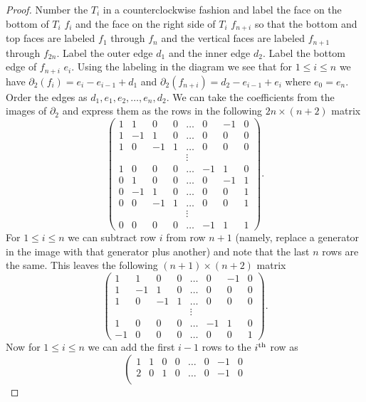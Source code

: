 \documentclass{article}
\begin{document}
\begin{proof}
Number the $T_i$ in a counterclockwise fashion and label the face on the bottom of $T_i$ $f_i$ and the face on the right side of $T_i$ $f_{n+i}$ so that the bottom and top faces are labeled $f_1$ through $f_n$ and the vertical faces are labeled $f_{n+1}$ through $f_{2n}$. Label the outer edge $d_1$ and the inner edge $d_2$. Label the bottom edge of $f_{n+i}$ $e_i$. Using the labeling in the diagram we see that for $1 \leq i \leq n$ we have $\partial_2(f_i) = e_i - e_{i-1} + d_1$ and $\partial_2(f_{n+i}) = d_2 - e_{i-1} + e_i$ where $e_0 = e_n$. Order the edges as $d_1, e_1, e_2, \dots , e_n, d_2$. We can take the coefficients from the images of $\partial_2$ and express them as the rows in the following $2n \times (n+2)$ matrix
\[
\left (
\begin{array}{cccccccc}
1 & 1 & 0 & 0 & \dots & 0 & -1 & 0\\
1 & -1 & 1 & 0 & \dots & 0 & 0 & 0\\
1 & 0 & -1 & 1 & \dots & 0 & 0 & 0\\
&&&& \vdots &&&\\
1 & 0 & 0 & 0 & \dots & -1 & 1 & 0\\
0 & 1 & 0 & 0 & \dots & 0 & -1 & 1\\
0 & -1 & 1 & 0 & \dots & 0 & 0 & 1\\
0 & 0 & -1 & 1 & \dots & 0 & 0 & 1\\
&&&& \vdots &&&\\
0 & 0 & 0 & 0 & \dots & -1 & 1 & 1
\end{array}
\right).
\]
For $1 \leq i \leq n$ we can subtract row $i$ from row $n+1$ (namely, replace a generator in the image with that generator plus another) and note that the last $n$ rows are the same. This leaves the following $(n+1) \times (n+2)$ matrix
\[
\left (
\begin{array}{cccccccc}
1 & 1 & 0 & 0 & \dots & 0 & -1 & 0\\
1 & -1 & 1 & 0 & \dots & 0 & 0 & 0\\
1 & 0 & -1 & 1 & \dots & 0 & 0 & 0\\
&&&& \vdots &&&\\
1 & 0 & 0 & 0 & \dots & -1 & 1 & 0\\
-1 & 0 & 0 & 0 & \dots & 0 & 0 & 1
\end{array}
\right ).
\]
Now for $1 \leq i \leq n$ we can add the first $i-1$ rows to the $i^{\textup{th}}$ row as
\[
\left (
\begin{array}{cccccccc}
1 & 1 & 0 & 0 & \dots & 0 & -1 & 0\\
2 & 0 & 1 & 0 & \dots & 0 & -1 & 0\\

\end{array}\]
\end{proof}
\end{document}

